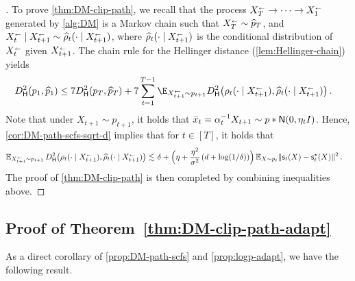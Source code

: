 \begin{proof}[]
To prove \cref{thm:DM-clip-path}, we recall that the process $X^{{\scriptscriptstyle\leftarrow}}_{T}\to\cdots\to X^{{\scriptscriptstyle\leftarrow}}_{1}$ generated by \cref{alg:DM} is a Markov chain such that $X^{{\scriptscriptstyle\leftarrow}}_{T}\sim \widehat{p}_T$, and $X^{{\scriptscriptstyle\leftarrow}}_{t}\mid X^{{\scriptscriptstyle\leftarrow}}_{t+1}\sim \widehat{\rho}_t(\cdot\mid X^{{\scriptscriptstyle\leftarrow}}_{t+1})$, where $\widehat{\rho}_t(\cdot\mid X^{{\scriptscriptstyle\leftarrow}}_{t+1})$ is the conditional distribution of $X^{{\scriptscriptstyle\leftarrow}}_{t}$ given $X^{{\scriptscriptstyle\leftarrow}}_{t+1}$.
The chain rule for the Hellinger distance (\cref{lem:Hellinger-chain}) yields
\begin{align*}
    \Dhels{p_1}{\wh p_1}
    &\leq 7 \Dhels{p_T}{\wh p_T} + 7\sum_{t=1}^{T-1} \E_{\xr{t+1} \sim p_{t+1}}\Dhels{\rho_t(\cdot \mid \xr{t+1})}{\wh\rho_t(\cdot \mid \xr{t+1})}\,.
\end{align*}
Note that under $X_{t+1}\sim p_{t+1}$, it holds that $\xbar_t=\alpha_t^{-1}X_{t+1}\sim p*\normal{0,\eta_t\Id}$. Hence, \cref{cor:DM-path-scfs-sqrt-d} implies that for $t\in[T]$, it holds that 
\begin{align*}
    \En_{\xr{t+1} \sim p_{t+1}}\Dhels{\rho_t(\cdot \mid \xr{t+1})}{\wh\rho_t(\cdot \mid \xr{t+1})}
    \leqsim&~ \delta+\prn[\Big]{\eta+\frac{\eta^2}{\sigma^2}\,(d+\log(1/\delta))} \En_{X\sim p_t}\nrm{\scf_t(X)-\scfs_t(X)}^2\,.
\end{align*}
The proof of \cref{thm:DM-clip-path} is then completed by combining inequalities above.
\end{proof}

\subsection{Proof of Theorem~\ref{thm:DM-clip-path-adapt}}


As a direct corollary of \cref{prop:DM-path-scfs} and \cref{prop:logp-adapt}, we have the following result.

